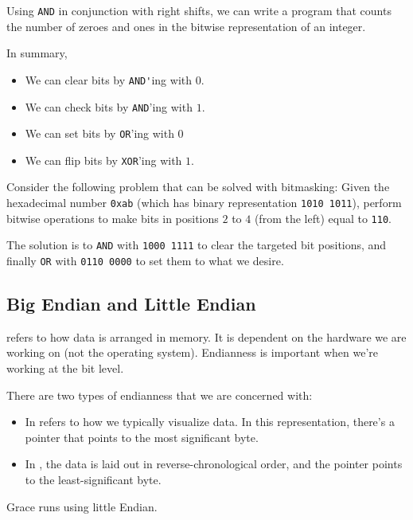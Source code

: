 Using \verb!AND! in conjunction with right shifts, we can write a program that counts the number of zeroes and ones in the bitwise representation of an integer.

In summary, \begin{itemize}
    \item We can clear bits by \verb!AND'!ing with $0$.
    \item We can check bits by \verb!AND!'ing with $1$.
    \item We can set bits by \verb!OR!'ing with $0$
    \item We can flip bits by \verb!XOR!'ing with $1$. 
\end{itemize}


Consider the following problem that can be solved with bitmasking: Given the hexadecimal number \verb!0xab! (which has binary representation \verb!1010 1011!), perform bitwise operations to make bits in positions $2$ to $4$ (from the left) equal to \verb!110!. 

The solution is to \verb!AND! with \verb!1000 1111! to clear the targeted bit positions, and finally \verb!OR! with \verb!0110 0000! to set them to what we desire. 


\subsection{Big Endian and Little Endian}

 refers to how data is arranged in memory. It is dependent on the hardware we are working on (not the operating system). Endianness is important when we're working at the bit level. 

There are two types of endianness that we are concerned with: \begin{itemize}
    \item In  refers to how we typically visualize data. In this representation, there's a pointer that points to the most significant byte. 
    \item In , the data is laid out in reverse-chronological order, and the pointer points to the least-significant byte.
\end{itemize}


Grace runs using little Endian.





